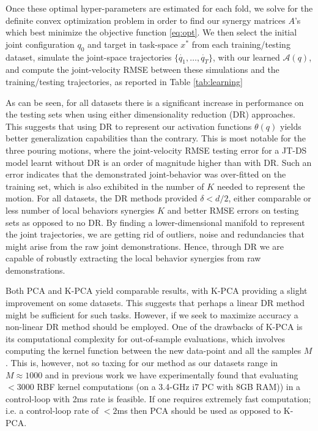 \documentclass[letterpaper, 10 pt, conference,fleqn]{ieeeconf}
\begin{document}
Once these optimal hyper-parameters are estimated for each fold, we solve for the definite convex optimization problem in order to find our synergy matrices $A$'s which best minimize the objective function \eqref{eq:opt}. We then select the initial joint configuration $q_0$ and target in task-space $x^*$ from each training/testing dataset, simulate the joint-space trajectories $\{\dot{q_1},\dots,\dot{q_T}\}$, with our learned $\mathcal{A}(q)$, and compute the joint-velocity RMSE between these simulations and the training/testing trajectories, as reported in Table \ref{tab:learning} 

As can be seen, for all datasets there is a significant increase in performance on the testing sets when using either dimensionality reduction (DR) approaches. This suggests that using DR to represent our activation functions $\theta(q)$ yields better generalization capabilities than the contrary. This is most notable for the three pouring motions, where the joint-velocity RMSE testing error for a JT-DS model learnt without DR is an order of magnitude higher than with DR. Such an error indicates that the demonstrated joint-behavior was over-fitted on the training set, which is also exhibited in the number of $K$ needed to represent the motion. For all datasets, the DR methods provided $\delta < d/2$, either comparable or less number of local behaviors synergies $K$ and better RMSE errors on testing sets as opposed to no DR. By finding a lower-dimensional manifold to represent the joint trajectories, we are getting rid of outliers, noise and redundancies that might arise from the raw joint demonstrations. Hence, through DR we are capable of robustly extracting the local behavior synergies from raw demonstrations. 

Both PCA and K-PCA yield comparable results, with K-PCA providing a slight improvement on some datasets. This suggests that perhaps a linear DR method might be sufficient for such tasks. However, if we seek to maximize accuracy a non-linear DR method should be employed. One of the drawbacks of K-PCA is its computational complexity for out-of-sample evaluations, which involves computing the kernel function between the new data-point and all the samples $M$. This is, however, not so taxing for our method as our datasets range in $M\approx1000$ and in previous work \cite{Mirrazavi:IJRR:2017} we have experimentally found that evaluating $<3000$ RBF kernel computations (on a 3.4-GHz i7 PC with 8GB RAM)) in a control-loop with 2ms rate is feasible. If one requires extremely fast computation; i.e. a control-loop rate of $<2$ms then PCA should be used as opposed to K-PCA.
\end{document}
